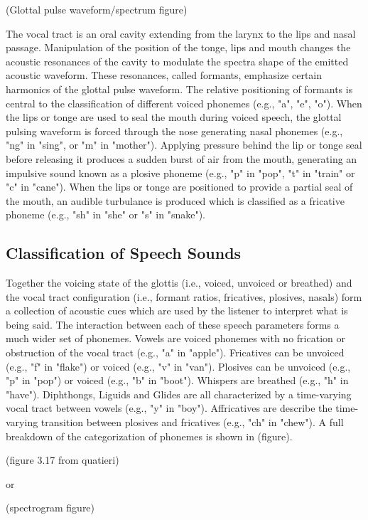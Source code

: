 (Glottal pulse waveform/spectrum figure)

The vocal tract is an oral cavity extending from the larynx to the lips and nasal passage. Manipulation of the position of the tonge, lips and mouth changes the acoustic resonances of the cavity to modulate the spectra shape of the emitted acoustic waveform. These resonances, called formants, emphasize certain harmonics of the glottal pulse waveform. The relative positioning of formants is central to the classification of different voiced phonemes (e.g., "a", "e", "o"). When the lips or tonge are used to seal the mouth during voiced speech, the glottal pulsing waveform is forced through the nose generating nasal phonemes (e.g., "ng" in "sing", or "m" in "mother"). Applying pressure behind the lip or tonge seal before releasing it produces a sudden burst of air from the mouth, generating an impulsive sound known as a plosive phoneme (e.g., "p" in "pop", "t" in "train" or "c" in "cane"). When the lips or tonge are positioned to provide a partial seal of the mouth, an audible turbulance is produced which is classified as a fricative phoneme (e.g., "sh" in "she" or "s" in "snake"). 

\subsection{Classification of Speech Sounds}

Together the voicing state of the glottis (i.e., voiced, unvoiced or breathed) and the vocal tract configuration (i.e., formant ratios, fricatives, plosives, nasals) form a collection of acoustic cues which are used by the listener to interpret what is being said.  The interaction between each of these speech parameters forms a much wider set of phonemes. Vowels are voiced phonemes with no frication or obstruction of the vocal tract (e.g., "a" in "apple"). Fricatives can be unvoiced (e.g., "f" in "flake") or voiced (e.g., "v" in "van"). Plosives can be unvoiced (e.g., "p" in "pop") or voiced (e.g., "b" in "boot").  Whispers are breathed (e.g., "h" in "have"). Diphthongs, Liguids and Glides are all characterized by a time-varying vocal tract between vowels (e.g., "y" in "boy"). Affricatives are describe the time-varying transition between plosives and fricatives (e.g., "ch" in "chew"). A full breakdown of the categorization of phonemes is shown in (figure).

(figure 3.17 from quatieri)

or 

(spectrogram figure)

